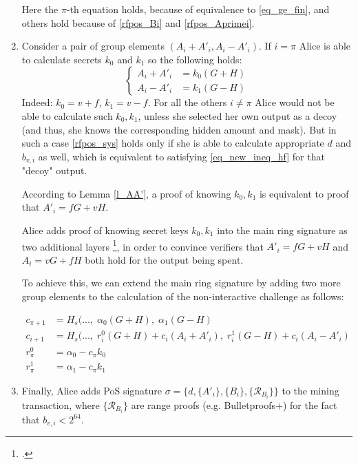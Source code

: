 \documentclass{article}
\numberwithin{figure}{section}
\begin{document}
\begin{enumerate}
    Here the $\pi$-th equation holds, because of equivalence to \eqref{eq_ge_fin}, and others hold because of \eqref{rfpos_Bi} and \eqref{rfpos_Aprimei}.
    
    \item Consider a pair of group elements $(A_i+A'_i, A_i-A'_i)$. If $i = \pi$ Alice is able to calculate secrets $k_0$ and $k_1$ so the following holds:
    \begin{equation*}
    \left\{ \begin{aligned} 
        A_i + A'_i &= k_0 (G + H) \\
        A_i - A'_i &= k_1 (G - H)
    \end{aligned} \right.
    \end{equation*}
    Indeed: $k_0 = v + f$, $k_1 = v - f$. For all the others $i \neq \pi$ Alice would not be able to calculate such $k_0, k_1$, unless she selected her own output as a decoy (and thus, she knows the corresponding hidden amount and mask). But in such a case \eqref{rfpos_sys} holds only if she is able to calculate appropriate $d$ and $b_{v,i}$ as well, which is equivalent to satisfying \eqref{eq_new_ineq_hf} for that "decoy" output.
    
    According to Lemma \ref{l_AA'}, a proof of knowing $k_0, k_1$ is equivalent to proof that $A'_i = fG + vH$.
    
    Alice adds proof of knowing secret keys $k_0, k_1$ into the main ring signature as two additional layers \footcite[Here we're using terminology and ideas from Multi-layered Linkable Spontaneous Anonymous Group signature proposed in][]{MRL0005}, in order to convince verifiers that $A'_i = fG + vH$ and $A_i = vG + fH$ both hold for the output being spent.
    
    To achieve this, we can extend the main ring signature by adding two more group elements to the calculation of the non-interactive challenge as follows:
    
    \begin{equation*} \begin{aligned}
        c_{\pi+1} &= H_s(\dots, \; \alpha_0 (G + H), \; \alpha_1 (G - H) \\
        c_{i+1} &= H_s(\dots, \; r^0_i (G + H) + c_i (A_i + A'_i), \; r^1_i (G - H) + c_i (A_i - A'_i) \\
        r^0_\pi &= \alpha_0 - c_\pi k_0 \\
        r^1_\pi &= \alpha_1 - c_\pi k_1
     \end{aligned} \end{equation*}
     
     \item Finally, Alice adds PoS signature $\sigma = \{ d, \{A'_i\}, \{B_i\}, \{\mathcal{R}_B_i\} \}$ to the mining transaction, where $\{\mathcal{R}_B_i\}$ are range proofs (e.g. Bulletproofs+) for the fact that $b_{v,i} < 2^{64}$.
\end{enumerate}
\end{document}
